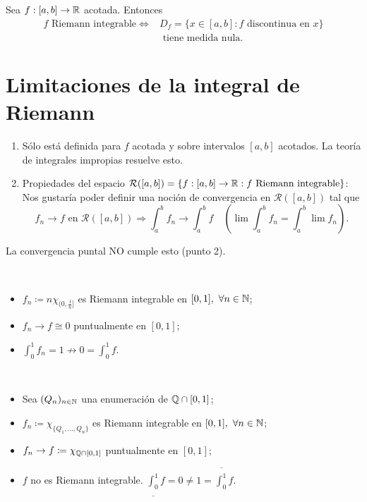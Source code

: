 \medskip
\begin{theorem}
	Sea $f:[a,b]\to\mathbb{R}$ acotada. Entonces
	\begin{align*}
		f \text{ Riemann integrable}\Longleftrightarrow & D_f=\{x\in[a,b]:f\text{ discontinua en } x\} \\ & \text{ tiene medida nula.}
	\end{align*}
\end{theorem}

\section{Limitaciones de la integral de Riemann}

\begin{enumerate}
	\item Sólo está definida para $f$ acotada y sobre intervalos $[a,b]$ acotados. La teoría de integrales impropias resuelve esto.

	\item Propiedades del espacio $\mathcal{R}([a,b])=\{f:[a,b]\to\mathbb{R}:f\text{ Riemann integrable}\}$: Nos gustaría poder definir una noción de convergencia en $\mathcal{R}([a,b])$ tal que
	\[
	f_n\to f \text { en } \mathcal{R}([a,b]) \Rightarrow \int_{a}^{b} f_n\to \int_{a}^{b} f \quad \left( \lim \int_{a}^{b} f_n = \int_{a}^{b} \lim f_n \right).
	\]
\end{enumerate}

\begin{remark}
	La convergencia puntal NO cumple esto (punto 2).
\end{remark}

\begin{eg}[1]~
	\begin{itemize}
		\item $f_n \coloneq n \chi_{(0,\frac{1}{n}]}$ es Riemann integrable en $[0,1],\ \forall n \in \mathbb{N}$;

		\item $f_n \to f \cong 0$ puntualmente en $[0,1]$;

		\item $\int_{0}^{1} f_n = 1 \not\to 0 = \int_{0}^{1} f$.
	\end{itemize}
\end{eg}

\begin{eg}[2]~
	\begin{itemize}
		\item Sea $(Q_n)_{n \in \mathbb{N}}$ una enumeración de $\mathbb{Q} \cap [0,1]$;

		\item $f_n \coloneq \chi_{\{ Q_1,\dots,Q_n \}}$ es Riemann integrable en $[0,1],\ \forall n \in \mathbb{N}$;

		\item $f_n \to f \coloneq \chi_{\mathbb{Q} \cap [0,1]}$ puntualmente en $[0,1]$;

		\item $f$ no es Riemann integrable. $\underline{\int_{0}^{1}} f = 0 \neq 1 = \overline{\int_{0}^{1}} f$.
	\end{itemize}
\end{eg}

